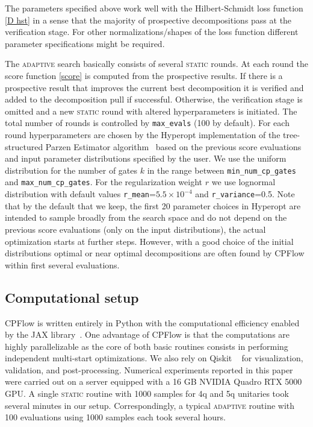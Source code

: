 \documentclass[twocolumn, amsfonts, amssymb, aps, nofootinbib]{revtex4-2}
\newcommand{\package}[1]{\textrm {#1 }}
\newcommand{\cpflow}{\package{CPFlow}}
\newcommand{\static}{\textsc{static }}
\newcommand{\adaptive}{\textsc{adaptive }}
\newcommand{\param}[1]{\texttt{#1}}
\begin{document}
The parameters specified above work well with the Hilbert-Schmidt loss function \eqref{D hst} in a sense that the majority of prospective decompositions pass at the verification stage. For other normalizations/shapes of the loss function different parameter specifications might be required.

The \adaptive search basically consists of several \static rounds. At each round the score function \eqref{score}  is computed from the prospective results. If there is a prospective result that improves the current best decomposition it is verified and added to the decomposition pull if successful. Otherwise, the verification stage is omitted and a new \static round with altered hyperparameters is initiated. The total number of rounds is controlled by \param{max\_evals} (100 by default). For each round hyperparameters are chosen by the \package{Hyperopt} implementation of the tree-structured Parzen Estimator algorithm~\cite{hyperopt} based on the previous score evaluations and input parameter distributions specified by the user. We use the uniform distribution for the number of gates $k$ in the range between \param{min\_num\_cp\_gates} and \param{max\_num\_cp\_gates}. For the regularization weight $r$ we use lognormal distribution with default values \param{r\_mean}=$5.5\times10^{-4}$ and \param{r\_variance}=0.5. Note that by the default that we keep, the first 20 parameter choices in Hyperopt are intended to sample broadly from the search space and do not depend on the previous score evaluations (only on the input distributions), the actual optimization starts at further steps. However, with a good choice of the initial distributions optimal or near optimal decompositions are often found by \cpflow within first several evaluations.
\subsection{Computational setup \label{server}}
\cpflow \cite{cpflow} is written entirely in Python with the computational efficiency enabled by the \package{JAX} library~\cite{jax2018github}. One advantage of \cpflow is that the computations are highly parallelizable as the core of both basic routines consists in performing independent multi-start optimizations. We also rely on \package{Qiskit}~\cite{Qiskit} for visualization, validation, and post-processing. Numerical experiments reported in this paper  were carried out on a server equipped with a 16 GB NVIDIA Quadro RTX 5000 GPU. A single \static routine with 1000 samples for 4q and 5q unitaries took several minutes in our setup.  Correspondingly, a typical \adaptive routine with 100 evaluations using 1000 samples each took several hours.
\end{document}
